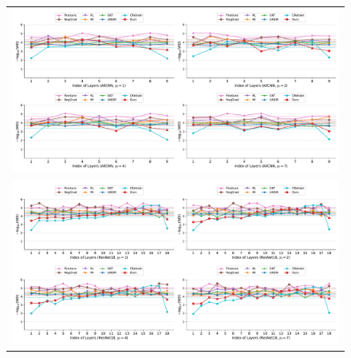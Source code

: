 \documentclass[preprint,12pt]{elsarticle}
\begin{document}
\begin{figure}[!h]
\centering
\begin{minipage}{\textwidth}
  \centering
  \begin{tabular}{c}
  \includegraphics[width=\textwidth]{output1_new.pdf} \\

  \includegraphics[width=\textwidth]{output2_new.pdf} \\
  \end{tabular}
\end{minipage}



\end{figure}
\end{document}
